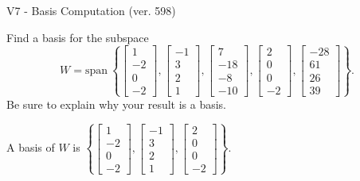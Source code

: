 \begin{exercise}
  \begin{exerciseTitle}V7 - Basis Computation (ver. 598)\end{exerciseTitle}
  \begin{exerciseStatement}
    Find a basis for the subspace 
\[W=\mathrm{span}\ \left\{\left[\begin{array}{r}
1 \\
-2 \\
0 \\
-2
\end{array}\right] , \left[\begin{array}{r}
-1 \\
3 \\
2 \\
1
\end{array}\right] , \left[\begin{array}{r}
7 \\
-18 \\
-8 \\
-10
\end{array}\right] , \left[\begin{array}{r}
2 \\
0 \\
0 \\
-2
\end{array}\right] , \left[\begin{array}{r}
-28 \\
61 \\
26 \\
39
\end{array}\right]\right\}.\]
 Be sure to explain why your result is a basis.


  \end{exerciseStatement}
  \begin{exerciseAnswer}
   A basis of \(W\) is  \(\left\{\left[\begin{array}{r}
1 \\
-2 \\
0 \\
-2
\end{array}\right] , \left[\begin{array}{r}
-1 \\
3 \\
2 \\
1
\end{array}\right] , \left[\begin{array}{r}
2 \\
0 \\
0 \\
-2
\end{array}\right]\right\}\).
  


  \end{exerciseAnswer}
\end{exercise}